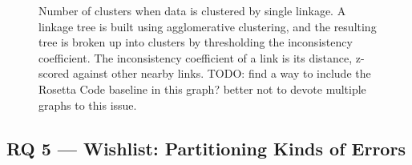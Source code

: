 \documentclass[conference]{IEEEtran}
\begin{document}

\begin{figure}
\caption{Number of clusters when data is clustered by single linkage.
  A linkage tree is built using agglomerative clustering, and the resulting tree is broken up
  into clusters by thresholding the inconsistency coefficient. The inconsistency coefficient
  of a link is its distance, z-scored against other nearby links. TODO: find a way to include
  the Rosetta Code baseline in this graph? better not to devote multiple graphs to this issue.}
\label{fig:diversity}
\end{figure}

\subsection{RQ 5 --- Wishlist: Partitioning Kinds of Errors}
\end{document}
